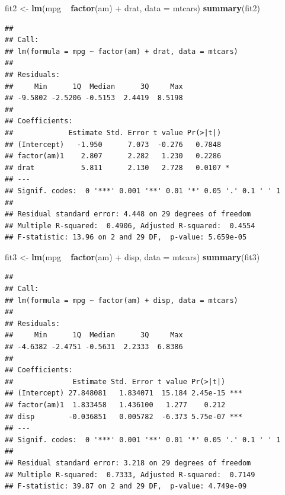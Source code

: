 \documentclass[]{article}
\newenvironment{Shaded}{\begin{snugshade}}{\end{snugshade}}
\newcommand{\KeywordTok}[1]{\textcolor[rgb]{0.13,0.29,0.53}{\textbf{{#1}}}}
\newcommand{\DataTypeTok}[1]{\textcolor[rgb]{0.13,0.29,0.53}{{#1}}}
\newcommand{\StringTok}[1]{\textcolor[rgb]{0.31,0.60,0.02}{{#1}}}
\newcommand{\NormalTok}[1]{{#1}}
\numberwithin{equation}{section}
\begin{document}
\begin{Shaded}
\begin{Highlighting}[]
\NormalTok{fit2 <-}\StringTok{ }\KeywordTok{lm}\NormalTok{(mpg ~}\StringTok{ }\KeywordTok{factor}\NormalTok{(am) +}\StringTok{ }\NormalTok{drat, }\DataTypeTok{data =} \NormalTok{mtcars)}
\KeywordTok{summary}\NormalTok{(fit2)}
\end{Highlighting}
\end{Shaded}

\begin{verbatim}
## 
## Call:
## lm(formula = mpg ~ factor(am) + drat, data = mtcars)
## 
## Residuals:
##     Min      1Q  Median      3Q     Max 
## -9.5802 -2.5206 -0.5153  2.4419  8.5198 
## 
## Coefficients:
##             Estimate Std. Error t value Pr(>|t|)  
## (Intercept)   -1.950      7.073  -0.276   0.7848  
## factor(am)1    2.807      2.282   1.230   0.2286  
## drat           5.811      2.130   2.728   0.0107 *
## ---
## Signif. codes:  0 '***' 0.001 '**' 0.01 '*' 0.05 '.' 0.1 ' ' 1
## 
## Residual standard error: 4.448 on 29 degrees of freedom
## Multiple R-squared:  0.4906, Adjusted R-squared:  0.4554 
## F-statistic: 13.96 on 2 and 29 DF,  p-value: 5.659e-05
\end{verbatim}

\begin{Shaded}
\begin{Highlighting}[]
\NormalTok{fit3 <-}\StringTok{ }\KeywordTok{lm}\NormalTok{(mpg ~}\StringTok{ }\KeywordTok{factor}\NormalTok{(am) +}\StringTok{ }\NormalTok{disp, }\DataTypeTok{data =} \NormalTok{mtcars)}
\KeywordTok{summary}\NormalTok{(fit3)}
\end{Highlighting}
\end{Shaded}

\begin{verbatim}
## 
## Call:
## lm(formula = mpg ~ factor(am) + disp, data = mtcars)
## 
## Residuals:
##     Min      1Q  Median      3Q     Max 
## -4.6382 -2.4751 -0.5631  2.2333  6.8386 
## 
## Coefficients:
##              Estimate Std. Error t value Pr(>|t|)    
## (Intercept) 27.848081   1.834071  15.184 2.45e-15 ***
## factor(am)1  1.833458   1.436100   1.277    0.212    
## disp        -0.036851   0.005782  -6.373 5.75e-07 ***
## ---
## Signif. codes:  0 '***' 0.001 '**' 0.01 '*' 0.05 '.' 0.1 ' ' 1
## 
## Residual standard error: 3.218 on 29 degrees of freedom
## Multiple R-squared:  0.7333, Adjusted R-squared:  0.7149 
## F-statistic: 39.87 on 2 and 29 DF,  p-value: 4.749e-09
\end{verbatim}
\end{document}

